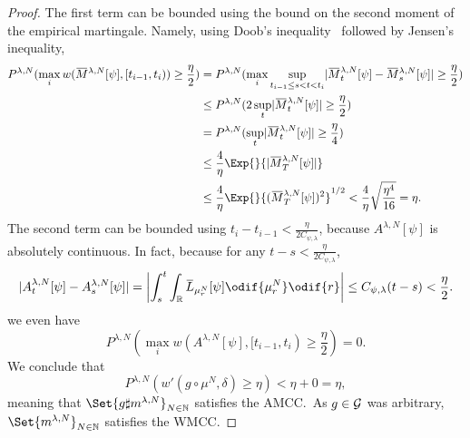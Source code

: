 \begin{proof}
  The first term can be bounded using the bound on the second moment of the empirical martingale.
  Namely, using Doob's inequality~\cite[64]{ethierMarkovProcessesCharacterization1985} followed by Jensen's inequality,
  \begin{equation}
    \begin{split}
      P^{\lambda, N}( \max_i w(\ol{M}^{\lambda, N}[\psi], [t_{i-1}, t_i)) \geq \frac{\eta}{2} )
       & = P^{\lambda, N}( \max_i \sup_{t_{i-1} \leq s < t < t_i} \abs{ \ol{M}_t^{\lambda, N}[\psi] - \ol{M}_s^{\lambda, N}[\psi] } \geq \frac{\eta}{2} ) \\
       & \leq P^{\lambda, N}( 2 \sup_{t} \abs{ \ol{M}_t^{\lambda, N}[\psi] } \geq \frac{\eta}{2} )                                                        \\
       & = P^{\lambda, N}( \sup_{t} \abs{ \ol{M}_t^{\lambda, N}[\psi] } \geq \frac{\eta}{4} )                                                             \\
       & \leq \frac{4}{\eta} \Exp{}{\abs{ \ol{M}_T^{\lambda, N}[\psi] }}                                                                                  \\
       & \leq \frac{4}{\eta} \Exp{}{ ( \ol{M}_T^{\lambda, N}[\psi] )^2 }^{1/2}
      < \frac{4}{\eta} \sqrt{\frac{\eta^4}{16}}
      = \eta.
    \end{split}
  \end{equation}
  The second term can be bounded using \( t_i - t_{i-1} < \frac{\eta}{2C_{\psi, \lambda}} \), because \( A^{\lambda, N}[\psi] \) is absolutely continuous.
  In fact, because for any \( t - s < \frac{\eta}{2C_{\psi, \lambda}} \),
  \begin{equation}
    \abs{ A_t^{\lambda, N}[\psi] - A_s^{\lambda, N}[\psi] }
    = \abs*{ \int_s^t \int_{\potspace} \ol{L}_{\mu_r^N}[\psi] \odif{\mu_r^N} \odif{r} }
    \leq C_{\psi,\lambda} (t - s)
    < \frac{\eta}{2}.
  \end{equation}
  we even have
  \begin{equation}
    P^{\lambda, N}( \max_i w(A^{\lambda, N}[\psi], [t_{i-1}, t_i) \geq \frac{\eta}{2}) = 0.
  \end{equation}
  We conclude that
  \begin{equation}
    P^{\lambda, N} (w'(g \circ \mu^N, \delta) \geq \eta)
    < \eta + 0 = \eta,
  \end{equation}
  meaning that \( \Set{g \sharp \lawmu^{\lambda,N}}_{N \in \bN} \) satisfies the AMCC.\
  As \( g \in \mathcal{G} \) was arbitrary, \( \Set{\lawmu^{\lambda,N}}_{N \in \bN} \) satisfies the WMCC.


\end{proof}
